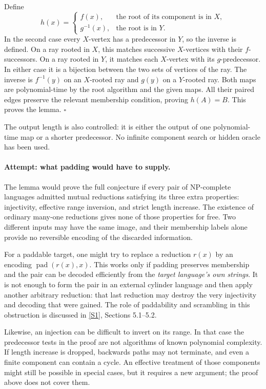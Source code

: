 \documentclass[11pt,a4paper]{article}
\newcommand{\sref}[2]{\hyperlink{source:#1:#2}{[S#2]}}
\numberwithin{equation}{section}
\begin{document}
Define
\begin{equation}\label{eq175-h}
 h(x)=\begin{cases}
       f(x),&\text{the root of its component is in }X,\\
       g^{-1}(x),&\text{the root is in }Y.
      \end{cases}
\end{equation}
In the second case every $X$-vertex has a predecessor in $Y$, so the
inverse is defined. On a ray rooted in $X$, this matches successive
$X$-vertices with their $f$-successors. On a ray rooted in $Y$, it matches
each $X$-vertex with its $g$-predecessor. In either case it is a bijection
between the two sets of vertices of the ray. The inverse is
$f^{-1}(y)$ on an $X$-rooted ray and $g(y)$ on a $Y$-rooted ray.
Both maps are polynomial-time by the root algorithm and the given maps.
All their paired edges preserve the relevant membership condition, proving
$h(A)=B$. This proves the lemma. \hfill$\square$

The output length is also controlled: it is either the output of one
polynomial-time map or a shorter predecessor. No infinite component search
or hidden oracle has been used.

\paragraph{Attempt: what padding would have to supply.}
The lemma would prove the full conjecture if every pair of NP-complete
languages admitted mutual reductions satisfying its three extra properties:
injectivity, effective range inversion, and strict length increase. The
existence of ordinary many-one reductions gives none of those properties
for free. Two different inputs may have the same image, and their membership
labels alone provide no reversible encoding of the discarded information.

For a paddable target, one might try to replace a reduction $r(x)$ by an
encoding $\operatorname{pad}(r(x),x)$. This works only if padding preserves
membership and the pair can be decoded efficiently from the \emph{target
language's own strings}. It is not enough to form the pair in an external
cylinder language and then apply another arbitrary reduction: that last
reduction may destroy the very injectivity and decoding that were gained.
The role of paddability and scrambling in this obstruction is discussed in
\sref{statement}{1}, Sections 5.1--5.2.

Likewise, an injection can be difficult to invert on its range. In that
case the predecessor tests in the proof are not algorithms of known
polynomial complexity. If length increase is dropped, backwards paths
may not terminate, and even a finite component can contain a cycle.
An effective treatment of those components might still be possible in
special cases, but it requires a new argument; the proof above does not
cover them.
\end{document}
